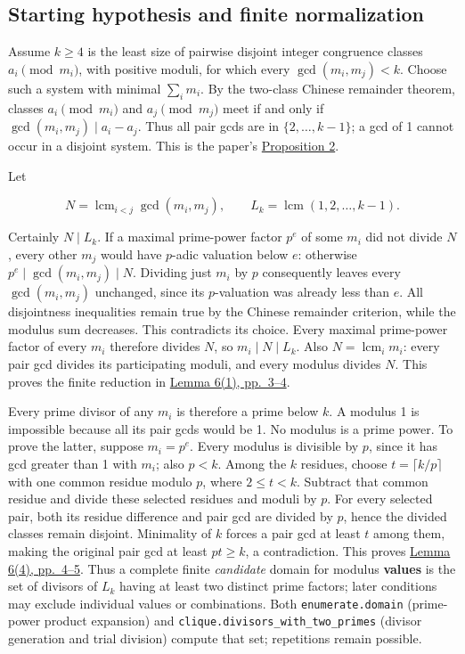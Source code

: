 \documentclass[11pt,a4paper]{article}
\begin{document}
\subsection{Starting hypothesis and finite normalization}\label{starting-hypothesis-and-finite-normalization}

Assume \(k\ge4\) is the least size of pairwise disjoint integer congruence classes \(a_i\pmod{m_i}\), with positive moduli, for which every \(\gcd(m_i,m_j)<k\). Choose such a system with minimal \(\sum_i m_i\). By the two-class Chinese remainder theorem, classes \(a_i\pmod{m_i}\) and \(a_j\pmod{m_j}\) meet if and only if \(\gcd(m_i,m_j)\mid a_i-a_j\). Thus all pair gcds are in \(\{2,\ldots,k-1\}\); a gcd of 1 cannot occur in a disjoint system. This is the paper's \href{https://arxiv.org/pdf/math/0604347v2}{Proposition 2}.

Let

\[
  N=\operatorname{lcm}_{i<j}\gcd(m_i,m_j),\qquad
  L_k=\operatorname{lcm}(1,2,\ldots,k-1).
\]

Certainly \(N\mid L_k\). If a maximal prime-power factor \(p^e\) of some \(m_i\) did not divide \(N\), every other \(m_j\) would have \(p\)-adic valuation below \(e\): otherwise \(p^e\mid\gcd(m_i,m_j)\mid N\). Dividing just \(m_i\) by \(p\) consequently leaves every \(\gcd(m_i,m_j)\) unchanged, since its \(p\)-valuation was already less than \(e\). All disjointness inequalities remain true by the Chinese remainder criterion, while the modulus sum decreases. This contradicts its choice. Every maximal prime-power factor of every \(m_i\) therefore divides \(N\), so \(m_i\mid N\mid L_k\). Also \(N=\operatorname{lcm}_i m_i\): every pair gcd divides its participating moduli, and every modulus divides \(N\). This proves the finite reduction in \href{https://arxiv.org/pdf/math/0604347v2}{Lemma 6(1), pp.~3--4}.

Every prime divisor of any \(m_i\) is therefore a prime below \(k\). A modulus 1 is impossible because all its pair gcds would be 1. No modulus is a prime power. To prove the latter, suppose \(m_i=p^e\). Every modulus is divisible by \(p\), since it has gcd greater than 1 with \(m_i\); also \(p<k\). Among the \(k\) residues, choose \(t=\lceil k/p\rceil\) with one common residue modulo \(p\), where \(2\le t<k\). Subtract that common residue and divide these selected residues and moduli by \(p\). For every selected pair, both its residue difference and pair gcd are divided by \(p\), hence the divided classes remain disjoint. Minimality of \(k\) forces a pair gcd at least \(t\) among them, making the original pair gcd at least \(pt\ge k\), a contradiction. This proves \href{https://arxiv.org/pdf/math/0604347v2}{Lemma 6(4), pp.~4--5}. Thus a complete finite \emph{candidate} domain for modulus \textbf{values} is the set of divisors of \(L_k\) having at least two distinct prime factors; later conditions may exclude individual values or combinations. Both \texttt{enumerate.domain} (prime-power product expansion) and \texttt{clique.divisors\_with\_two\_primes} (divisor generation and trial division) compute that set; repetitions remain possible.
\end{document}
